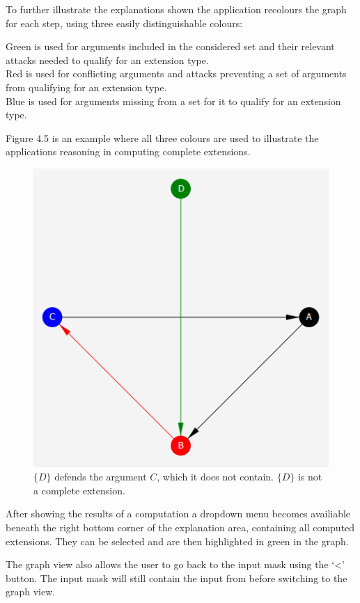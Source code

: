 \documentclass[draft,final]{vutinfth} %
\newcommand{\hl}{\par\vspace{6pt}} %
\begin{document}
To further illustrate the explanations shown the application recolours the graph for each step, using three easily distinguishable colours:\hl
Green is used for arguments included in the considered set and their relevant attacks needed to qualify for an extension type.\\
Red is used for conflicting arguments and attacks preventing a set of arguments from qualifying for an extension type.\\
Blue is used for arguments missing from a set for it to qualify for an extension type.\hl
Figure 4.5 is an example where all three colours are used to illustrate the applications reasoning in computing complete extensions.\hl

\FloatBarrier
	\begin{figure}[!h]
		\centering
		\includegraphics{pics/colored.png}
		\caption{$\{D\}$ defends the argument $C$, which it does not contain. $\{D\}$ is not a complete extension.}
	\end{figure}
\FloatBarrier

After showing the results of a computation a dropdown menu becomes availiable beneath the right bottom corner of the explanation area, containing all computed extensions. They can be selected and are then highlighted in green in the graph.\hl
The graph view also allows the user to go back to the input mask using the `<' button. The input mask will still contain the input from before switching to the graph view.
\end{document}
